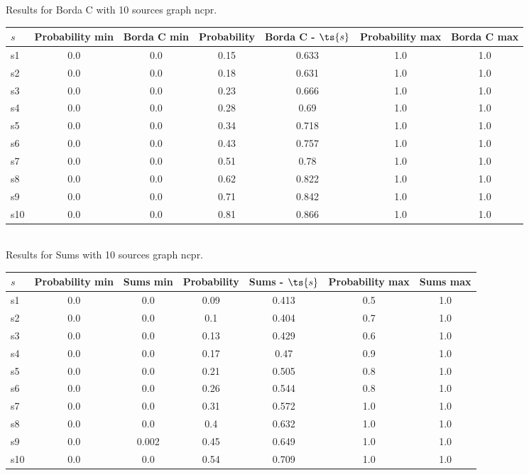 \documentclass{article}
\begin{document}
\noindent Results for Borda C with 10 sources graph ncpr.

\noindent\begin{tabular}{|l|c|c|c|c|c|c|}
\hline
$s$& Probability min & Borda C min & Probability & Borda C - $\ts{s}$ & Probability max & Borda C max\\
\hline
s1 &0.0 & 0.0 & 0.15 & 0.633 & 1.0 & 1.0\\
\hline
s2 &0.0 & 0.0 & 0.18 & 0.631 & 1.0 & 1.0\\
\hline
s3 &0.0 & 0.0 & 0.23 & 0.666 & 1.0 & 1.0\\
\hline
s4 &0.0 & 0.0 & 0.28 & 0.69 & 1.0 & 1.0\\
\hline
s5 &0.0 & 0.0 & 0.34 & 0.718 & 1.0 & 1.0\\
\hline
s6 &0.0 & 0.0 & 0.43 & 0.757 & 1.0 & 1.0\\
\hline
s7 &0.0 & 0.0 & 0.51 & 0.78 & 1.0 & 1.0\\
\hline
s8 &0.0 & 0.0 & 0.62 & 0.822 & 1.0 & 1.0\\
\hline
s9 &0.0 & 0.0 & 0.71 & 0.842 & 1.0 & 1.0\\
\hline
s10 &0.0 & 0.0 & 0.81 & 0.866 & 1.0 & 1.0\\
\hline
\end{tabular}\\

\noindent Results for Sums with 10 sources graph ncpr.

\noindent\begin{tabular}{|l|c|c|c|c|c|c|}
\hline
$s$& Probability min & Sums min & Probability & Sums - $\ts{s}$ & Probability max & Sums max\\
\hline
s1 &0.0 & 0.0 & 0.09 & 0.413 & 0.5 & 1.0\\
\hline
s2 &0.0 & 0.0 & 0.1 & 0.404 & 0.7 & 1.0\\
\hline
s3 &0.0 & 0.0 & 0.13 & 0.429 & 0.6 & 1.0\\
\hline
s4 &0.0 & 0.0 & 0.17 & 0.47 & 0.9 & 1.0\\
\hline
s5 &0.0 & 0.0 & 0.21 & 0.505 & 0.8 & 1.0\\
\hline
s6 &0.0 & 0.0 & 0.26 & 0.544 & 0.8 & 1.0\\
\hline
s7 &0.0 & 0.0 & 0.31 & 0.572 & 1.0 & 1.0\\
\hline
s8 &0.0 & 0.0 & 0.4 & 0.632 & 1.0 & 1.0\\
\hline
s9 &0.0 & 0.002 & 0.45 & 0.649 & 1.0 & 1.0\\
\hline
s10 &0.0 & 0.0 & 0.54 & 0.709 & 1.0 & 1.0\\
\hline
\end{tabular}\\
\end{document}
